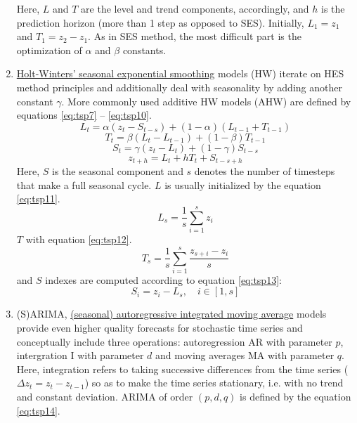 \documentclass[3p,times,procedia]{elsarticle}
\begin{document}
\begin{enumerate}
Here, $L$ and $T$ are the level and trend components, accordingly, and $h$ is the prediction horizon (more than 1 step as opposed to SES). Initially, $L_1 = z_1$ and $T_1 = z_2 - z_1$. As in SES method, the most difficult part is the optimization of $\alpha$ and $\beta$ constants.
\item \underline{Holt-Winters' seasonal exponential smoothing} models (HW) iterate on HES method principles and additionally deal with seasonality by adding another constant $\gamma$. More commonly used additive HW models (AHW) are defined by equations \ref{eq:tsp7} -- \ref{eq:tsp10}.
\begin{equation} \label{eq:tsp7}
L_t = \alpha (z_t - S_{t-s}) + (1-\alpha) (L_{t-1} + T_{t-1})
\end{equation}
\begin{equation} \label{eq:tsp8}
T_t = \beta (L_t - L_{t-1}) + (1-\beta) T_{t-1}
\end{equation}
\begin{equation} \label{eq:tsp9}
S_t = \gamma (z_t - L_t) + (1-\gamma) S_{t-s}
\end{equation}
\begin{equation} \label{eq:tsp10}
z_{t+h} = L_t + hT_t + S_{t-s+h}
\end{equation}
Here, $S$ is the seasonal component and $s$ denotes the number of timesteps that make a full seasonal cycle. $L$ is usually initialized by the equation \ref{eq:tsp11}.
\begin{equation} \label{eq:tsp11}
L_s = \frac{1}{s} \sum_{i=1}^s z_i
\end{equation}
$T$ with equation \ref{eq:tsp12}.
\begin{equation} \label{eq:tsp12}
T_s = \frac{1}{s} \sum_{i=1}^s \frac{z_{s+i} - z_i}{s}
\end{equation}
and $S$ indexes are computed according to equation \ref{eq:tsp13}:
\begin{equation} \label{eq:tsp13}
S_i = z_i - L_s, \quad i \in [1,s]
\end{equation}
\item (S)ARIMA, \underline{(seasonal) autoregressive integrated moving average} models provide even higher quality forecasts for stochastic time series and conceptually include three operations: autoregression AR with parameter $p$, intergration I with parameter $d$ and moving averages MA with parameter $q$. Here, integration refers to taking successive differences from the time series ($\Delta z_t = z_t - z_{t-1}$) so as to make the time series stationary, i.e. with no trend and constant deviation. ARIMA of order $(p,d,q)$ is defined by the equation \ref{eq:tsp14}.

\end{enumerate}
\end{document}
